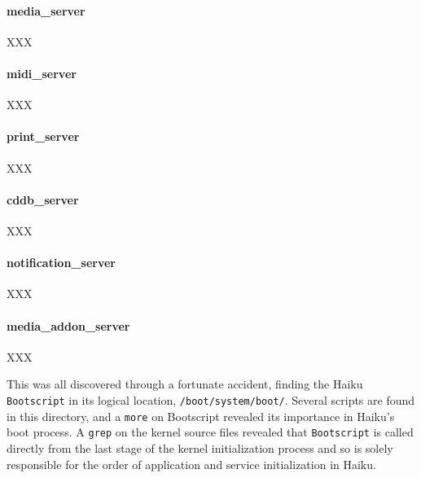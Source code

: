 \documentclass{article}
\begin{document}
\paragraph{media\_server}
XXX

\paragraph{midi\_server}
XXX

\paragraph{print\_server}
XXX

\paragraph{cddb\_server}
XXX

\paragraph{notification\_server}
XXX

\paragraph{media\_addon\_server}
XXX

This was all discovered through a fortunate accident, finding the
Haiku \texttt{Bootscript} in its logical
location, \texttt{/boot/system/boot/}.  Several scripts are found in
this directory, and a \texttt{more} on Bootscript revealed its
importance in Haiku's boot process. A \texttt{grep} on the kernel
source files revealed that \texttt{Bootscript} is called directly from
the last stage of the kernel initialization
process \cite{HaikuKernelMain} and so is solely responsible for the
order of application and service initialization in Haiku.

{}

\end{document}
